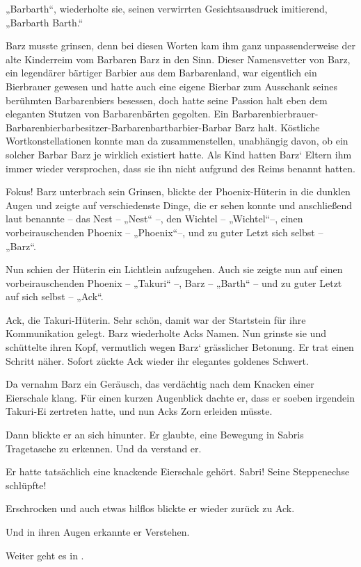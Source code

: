 „Barbarth“, wiederholte sie, seinen verwirrten Gesichtsausdruck imitierend, „Barbarth Barth.“

Barz musste grinsen, denn bei diesen Worten kam ihm ganz unpassenderweise der alte Kinderreim vom Barbaren Barz in den Sinn. Dieser Namensvetter von Barz, ein legendärer bärtiger Barbier aus dem Barbarenland, war eigentlich ein Bierbrauer gewesen und hatte auch eine eigene Bierbar zum Ausschank seines berühmten Barbarenbiers besessen, doch hatte seine Passion halt eben dem eleganten Stutzen von Barbarenbärten gegolten. Ein Barbarenbierbrauer-Barbarenbierbarbesitzer-Barbarenbartbarbier-Barbar Barz halt. Köstliche Wortkonstellationen konnte man da zusammenstellen, unabhängig davon, ob ein solcher Barbar Barz je wirklich existiert hatte. Als Kind hatten Barz‘ Eltern ihm immer wieder versprochen, dass sie ihn nicht aufgrund des Reims benannt hatten.

Fokus! Barz unterbrach sein Grinsen, blickte der Phoenix-Hüterin in die dunklen Augen und zeigte auf verschiedenste Dinge, die er sehen konnte und anschließend laut benannte – das Nest – „Nest“ –, den Wichtel – „Wichtel“–, einen vorbeirauschenden Phoenix – „Phoenix“–, und zu guter Letzt sich selbst – „Barz“.

Nun schien der Hüterin ein Lichtlein aufzugehen. Auch sie zeigte nun auf einen vorbeirauschenden Phoenix – „Takuri“ –, Barz – „Barth“ – und zu guter Letzt auf sich selbst – „Ack“.

Ack, die Takuri-Hüterin. Sehr schön, damit war der Startstein für ihre Kommunikation gelegt. Barz wiederholte Acks Namen. Nun grinste sie und schüttelte ihren Kopf, vermutlich wegen Barz‘ grässlicher Betonung. Er trat einen Schritt näher. Sofort zückte Ack wieder ihr elegantes goldenes Schwert.

Da vernahm Barz ein Geräusch, das verdächtig nach dem Knacken einer Eierschale klang. Für einen kurzen Augenblick dachte er, dass er soeben irgendein Takuri-Ei zertreten hatte, und nun Acks Zorn erleiden müsste.

Dann blickte er an sich hinunter. Er glaubte, eine Bewegung in Sabris Tragetasche zu erkennen. Und da verstand er.

Er hatte tatsächlich eine knackende Eierschale gehört. Sabri! Seine Steppenechse schlüpfte!

Erschrocken und auch etwas hilflos blickte er wieder zurück zu Ack.

Und in ihren Augen erkannte er Verstehen.

\begin{center}
    Weiter geht es in .
\end{center}












